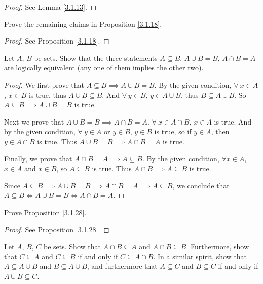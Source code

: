 \begin{proof}
See Lemma \ref{3.1.13}.
\end{proof}

\begin{exercise}\label{ex 3.1.4}
Prove the remaining claims in Proposition \ref{3.1.18}.
\end{exercise}

\begin{proof}
See Proposition \ref{3.1.18}.
\end{proof}

\begin{exercise}\label{ex 3.1.5}
Let \(A\), \(B\) be sets.
Show that the three statements \(A \subseteq B\), \(A \cup B = B\), \(A \cap B = A\) are logically equivalent (any one of them implies the other two).
\end{exercise}

\begin{proof}
We first prove that \(A \subseteq B \implies A \cup B = B\).
By the given condition, \(\forall\ x \in A\), \(x \in B\) is true, thus \(A \cup B \subseteq B\).
And \(\forall\ y \in B\), \(y \in A \cup B\), thus \(B \subseteq A \cup B\).
So \(A \subseteq B \implies A \cup B = B\) is true.

Next we prove that \(A \cup B = B \implies A \cap B = A\).
\(\forall\ x \in A \cap B\), \(x \in A\) is true.
And by the given condition, \(\forall\ y \in A\) or \(y \in B\), \(y \in B\) is true, so if \(y \in A\), then \(y \in A \cap B\) is true.
Thus \(A \cup B = B \implies A \cap B = A\) is true.

Finally, we prove that \(A \cap B = A \implies A \subseteq B\).
By the given condition, \(\forall x \in A\), \(x \in A\) and \(x \in B\), so \(A \subseteq B\) is true.
Thus \(A \cap B \implies A \subseteq B\) is true.

Since \(A \subseteq B \implies A \cup B = B \implies A \cap B = A \implies A \subseteq B\), we conclude that \(A \subseteq B \iff A \cup B = B \iff A \cap B = A\).
\end{proof}

\begin{exercise}\label{ex 3.1.6}
Prove Proposition \ref{3.1.28}.
\end{exercise}

\begin{proof}
See Proposition \ref{3.1.28}.
\end{proof}

\begin{exercise}\label{ex 3.1.7}
Let \(A\), \(B\), \(C\) be sets.
Show that \(A \cap B \subseteq A\) and \(A \cap B \subseteq B\).
Furthermore, show that \(C \subseteq A\) and \(C \subseteq B\) if and only if \(C \subseteq A \cap B\).
In a similar spirit, show that \(A \subseteq A \cup B\) and \(B \subseteq A \cup B\), and furthermore that \(A \subseteq C\) and \(B \subseteq C\) if and only if \(A \cup B \subseteq C\).
\end{exercise}

